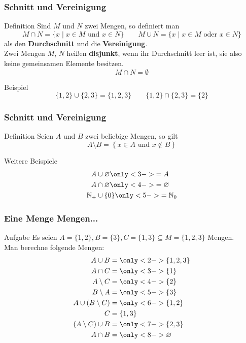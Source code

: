 \begin{frame}
	\frametitle{Schnitt und Vereinigung}
	
	\begin{block}{Definition}
		Sind $M$ und $N$ zwei Mengen, so definiert man
		$$M \cap N = \{x \mid x \in M \text{ und } x \in N\} \qquad M \cup N = \{x \mid x \in M \text{ oder } x \in N\} $$
		als den \textbf{Durchschnitt} und die \textbf{Vereinigung}.\\[1em] 
		\pause
		Zwei Mengen $M$, $N$ heißen \textbf{disjunkt}, wenn ihr Durchschnitt leer ist, sie also keine gemeinsamen Elemente besitzen. $$M \cap N = \emptyset$$
	\end{block}

	\pause
	\begin{block}{Beispiel}
		$$ \{1,2\} \cup \{2,3\} = \{1,2,3\} \qquad \{1,2\} \cap \{2,3\} = \{2\} $$
	\end{block}

\end{frame}

\begin{frame}
	\frametitle{Schnitt und Vereinigung}
	\begin{block}{Definition}
		Seien $A$ und $B$ zwei beliebige Mengen, so gilt $$ A\setminus B = \left\{ x\in A \text{ und } x\notin  B  \right\} $$ 
	\end{block}
	
	\pause

	\begin{block}{Weitere Beispiele}
		\begin{align*}
			A &\cup \emptyset \only<3->{ = A }  \\
			A &\cap \emptyset \only<4->{ = \emptyset }\\
			\N_+ &\cup \{0\} \only<5->{ = \N_0} \\
		\end{align*}
	\end{block}

\end{frame}

\begin{frame}
	\frametitle{Eine Menge Mengen...}
	\begin{block}{Aufgabe}
		Es seien $A = \{1, 2\}, B = \{3\}, C = \{1, 3\}  \subseteq M = \{1, 2, 3\}$ Mengen.\\
		Man berechne folgende Mengen:
		\begin{align*}
		A \cup B &= \only<2->{ \{1, 2, 3\} }  \\
		A \cap C &= \only<3->{ \{1\} }\\
		A \setminus C &= \only<4->{ \{2\} }\\
		B \setminus A &= \only<5->{ \{3\} }\\
		A \cup (B \setminus C) &= \only<6->{ \{1, 2\} }\\
		C &= \{1, 3\} \\
		(A \setminus C) \cup B &= \only<7->{ \{2, 3\} }\\
		A \cap B &= \only<8->{ \emptyset }
		\end{align*}
	\end{block}
\end{frame}

